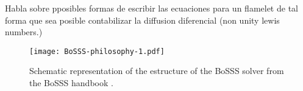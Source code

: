 \cite{pitschConsistentFlameletFormulation1998} Habla sobre pposibles formas de escribir las ecuaciones para un flamelet de tal forma que sea posible contabilizar la diffusion diferencial (non unity lewis numbers.)



\begin{figure}
	\texttt{[image: BoSSS-philosophy-1.pdf]}
	\caption{Schematic representation of the estructure of the \gls{BoSSS} solver from the \gls{BoSSS} handbook \parencite{kummer2020}.}
	\label{Fig:BoSSS}
\end{figure}